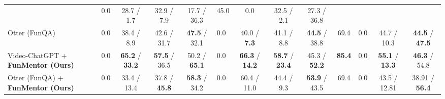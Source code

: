 \begin{table}[t]
{{\begin{tabular}{lp{1cm}<{\centering} cccp{1cm}<{\centering}ccccp{1cm}<{\centering}cc}
& 0.0 
& 28.7 / 1.7
& 32.9 / 7.9
& 17.7 / 36.3
& 45.0

& 0.0 
& 32.5 / 2.1
& 27.3 / 36.8 \\
\rowcolor{I-Model}
Otter (FunQA) \cite{li2023otter} 
& 0.0 
& 38.4 / 8.9
& 42.6 / 31.7
& \textbf{47.5} / 32.1

& 0.0 
& 40.0 / \textbf{7.3}
& 41.1 / 8.8
& \textbf{44.5} / 38.8
& 69.4

& 0.0 
& 44.7 / 10.3
& \textbf{44.5} / \textbf{47.5} \\
\midrule
\rowcolor{O-Model}
Video-ChatGPT \cite{maaz2023videochatgpt}  + \textbf{FunMentor (Ours)}
& 0.0 
& \textbf{65.2} / \textbf{33.2}
& \textbf{57.5} / 36.5
& 50.2 / \textbf{65.1}

& 0.0 
& \textbf{66.3} / \textbf{14.2}
& \textbf{58.7} / \textbf{23.4}
& 45.3 / \textbf{52.2}
& \textbf{85.4}

& 0.0
& \textbf{55.1} / \textbf{13.3}
& \textbf{46.3} / 54.8 \\
\rowcolor{O-Model}
Otter (FunQA) \cite{li2023otter} + \textbf{FunMentor (Ours)}
& 0.0
& 33.4 / 13.4
& 37.8 / \textbf{45.8}
& \textbf{58.3} / 34.2

& 0.0 
& 60.4 / 11.0
& 44.4 / 9.3
& \textbf{53.9} / 43.5
& 69.4

& 0.0 
& 43.5 / 12.81
& 38.91 / \textbf{56.4}\\



\bottomrule

\end{tabular}}\par
}
\vspace{-0.5cm}
\end{table}
